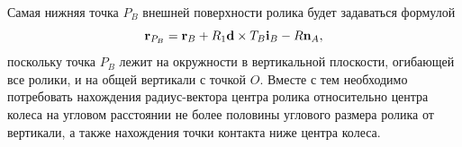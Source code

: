 Самая нижняя точка $P_B$ внешней 
поверхности ролика будет задаваться формулой
\begin{equation}
{\bf r}_{P_B}={\bf r}_B+R_1{\bf d}\times T_B{\bf i}_B-R{\bf n}_A,
\label{3_2_0}
\end{equation}
поскольку точка $P_B$ лежит на окружности в вертикальной плоскости, огибающей все ролики, и на общей вертикали с точкой $O$.
Вместе с тем необходимо потребовать нахождения радиус-вектора центра ролика
относительно центра колеса на угловом расстоянии не более половины углового размера ролика от вертикали, а также нахождения точки контакта ниже центра колеса.



